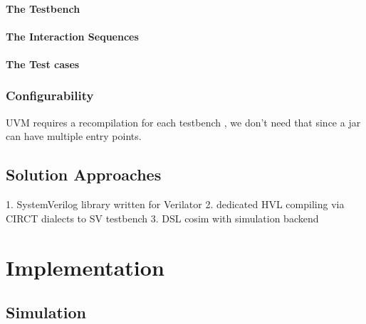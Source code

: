 \documentclass[12pt]{book}
\begin{document}
\subsubsection{The Testbench}

\subsubsection{The Interaction Sequences}

\subsubsection{The Test cases}

\subsection{Configurability} %

UVM requires a recompilation for each testbench \cite{salemi2013uvm}, we don't need that since a jar can have
multiple entry points.

\section{Solution Approaches}

1. SystemVerilog library written for Verilator
2. dedicated HVL compiling via CIRCT dialects to SV testbench
3. DSL cosim with simulation backend



\chapter{Implementation} %

\section{Simulation} %
\end{document}
